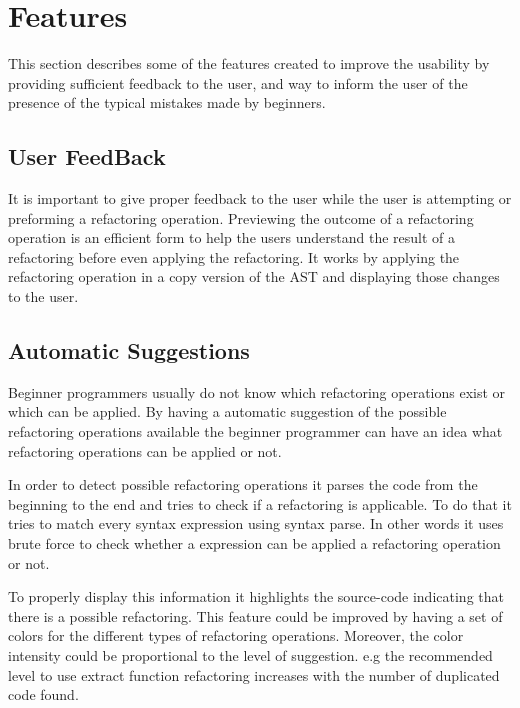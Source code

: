 \section{Features}
This section describes some of the features created to improve the usability by providing
sufficient feedback to the user, and way to inform the user of the presence
of the typical mistakes made by beginners.
\subsection{User FeedBack}
It is important to give proper feedback to the user while the user is attempting or
preforming a refactoring operation.
Previewing the outcome of a refactoring operation is an efficient form to
help the users understand the result of a refactoring before even applying the refactoring. %
It works by applying the refactoring operation in a copy version of the AST
and displaying those changes to the user.

\subsection{Automatic Suggestions}
Beginner programmers usually do not know which refactoring operations exist or
which can be applied.
By having a automatic suggestion of the possible refactoring operations available
 the beginner programmer can have an idea what refactoring operations can be
 applied or not.

In order to detect possible refactoring operations it parses the code from the
beginning to the end and tries to check if a refactoring is applicable.
To do that it tries to match every syntax expression using syntax parse.
In other words it uses brute force to check whether a expression can be applied
a refactoring operation or not.

To properly display this information it highlights the source-code indicating
that there is a possible refactoring.
This feature could be improved by having a set of colors for the different types
of refactoring operations.
Moreover, the color intensity could be proportional to the level
of suggestion. e.g the recommended level to use extract function refactoring
increases with the number of duplicated code found.

